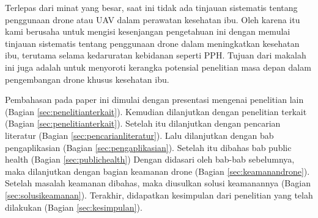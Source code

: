 Terlepas dari minat yang besar, saat ini tidak ada tinjauan sistematis tentang penggunaan drone atau UAV dalam perawatan kesehatan ibu. Oleh karena itu kami berusaha untuk mengisi kesenjangan pengetahuan ini dengan memulai tinjauan sistematis tentang penggunaan drone dalam meningkatkan kesehatan ibu, terutama selama kedaruratan kebidanan seperti PPH. Tujuan dari makalah ini juga adalah untuk menyoroti kerangka potensial penelitian masa depan dalam pengembangan drone khusus kesehatan ibu.

Pembahasan pada paper ini dimulai dengan presentasi mengenai penelitian lain (Bagian \ref{sec:penelitianterkait}).
Kemudian dilanjutkan dengan penelitian terkait (Bagian \ref{sec:penelitianterkait}).
Setelah itu dilanjutkan dengan pencarian literatur (Bagian \ref{sec:pencarianliteratur}).
Lalu dilanjutkan dengan bab pengaplikasian (Bagian \ref{sec:pengaplikasian}).
Setelah itu dibahas bab public health (Bagian \ref{sec:publichealth})
Dengan didasari oleh bab-bab sebelumnya, maka dilanjutkan dengan bagian keamanan drone (Bagian \ref{sec:keamanandrone}).
Setelah masalah keamanan dibahas, maka diusulkan solusi keamanannya (Bagian \ref{sec:solusikeamanan}).
Terakhir, didapatkan kesimpulan dari penelitian yang telah dilakukan (Bagian \ref{sec:kesimpulan}).
